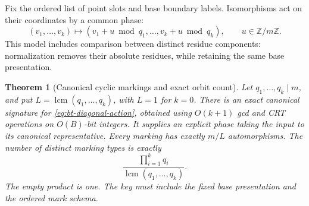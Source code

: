 \documentclass[11pt]{article}
\newtheorem{theorem}{Theorem}[section]
\theoremstyle{definition}
\theoremstyle{remark}
\newcommand{\Z}{\mathbb Z}
\newcommand{\lcm}{\operatorname{lcm}}
\begin{document}
Fix the ordered list of point slots and base boundary labels.  Isomorphisms
act on their coordinates by a common phase:
\begin{equation}\label{eq:bt-diagonal-action}
 (v_1,\ldots,v_k)\longmapsto
 (v_1+u\bmod q_1,\ldots,v_k+u\bmod q_k),\qquad u\in\Z/m\Z.
\end{equation}
This model includes comparison between distinct residue components:
normalization removes their absolute residues, while retaining the same
base presentation.

\begin{theorem}[Canonical cyclic markings and exact orbit count]\label{thm:bt-canonical}
Let $q_1,\ldots,q_k\mid m$, and put
$L=\lcm(q_1,\ldots,q_k)$, with $L=1$ for $k=0$.
There is an exact canonical signature for
\eqref{eq:bt-diagonal-action}, obtained using $O(k+1)$ gcd and CRT
operations on $O(B)$-bit integers.  It supplies an explicit phase taking
the input to its canonical representative.  Every marking has exactly
$m/L$ automorphisms.  The number of distinct marking types is exactly
\begin{equation}\label{eq:bt-exact-type-count}
 \frac{\prod_{i=1}^{k}q_i}{\lcm(q_1,\ldots,q_k)}.
\end{equation}
The empty product is one.  The key must include the fixed base
presentation and the ordered mark schema.
\end{theorem}
\end{document}
